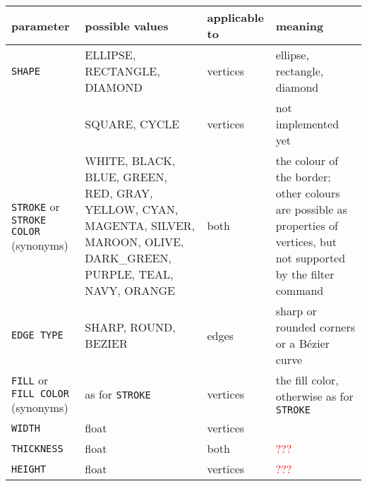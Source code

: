 \begin{table}
  \centering
  \renewcommand{\arraystretch}{2}
  \begin{tabular}{p{3cm}|p{5cm}|p{1.8cm}|p{5cm}}
    \textbf{parameter} &  \textbf{possible values} & \textbf{applicable to}  & \textbf{meaning}\\
    \hline
    \texttt{SHAPE}     &  ELLIPSE, RECTANGLE, DIAMOND & vertices& ellipse,
                                                                  rectangle, diamond\\
                       &  SQUARE, CYCLE & vertices & not implemented yet\\
    \hline
    \texttt{STROKE} or \texttt{STROKE COLOR} (synonyms)
                       &  WHITE, BLACK, BLUE, GREEN, RED, GRAY, \mbox{YELLOW},
                         CYAN, MAGENTA, SILVER, MAROON, OLIVE,
                         DARK\_GREEN, PURPLE, TEAL, NAVY, ORANGE
                                                   & both & the colour of the
                                                            border; other
                                                            colours are
                                                            possible as
                                                            properties of
                                                            vertices, but not
                                                            supported by the
                                                            filter
                                                            command\\
    \hline
    \texttt{EDGE TYPE} & SHARP, ROUND, BEZIER & edges & sharp or rounded
                                                        corners or a
                                                        B\'{e}zier curve\\
    \hline
    \texttt{FILL} or \texttt{FILL COLOR} (synonyms)
                       & as for \texttt{STROKE} & vertices & the fill color,
                                                             otherwise as for
                                                             \texttt{STROKE}\\
    \hline
    \texttt{WIDTH}     & float                 & vertices & \tcr{???}\\
    \hline
    \texttt{THICKNESS} & float                 & both\tcr{?} & \textcolor{red}{???}\\
    \hline
    \texttt{HEIGHT}     & float                & vertices  & \textcolor{red}{???}\\

\end{tabular}
\end{table}
